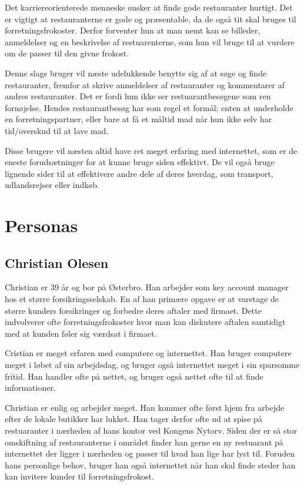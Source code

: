 \documentclass[a4paper, 12pt]{article}
\begin{document}
Det karriereorienterede menneske ønsker at finde gode restauranter hurtigt. Det
er vigtigt at restauranterne er gode og præsentable, da de også tit skal bruges
til forretningsfrokoster. Derfor forventer hun at man nemt kan se billeder,
anmeldelser og en beskrivelse af restuarenterne, som hun vil bruge til at
vurdere om de passer til den givne frokost. 

Denne slags bruger vil næste udelukkende benytte sig af at søge og finde
restauranter, fremfor at skrive anmeldelser af restauranter og kommentarer af
andres restauranter. Det er fordi hun ikke ser restuarantbesøgene som ren
fornøjelse. Hendes restaurantbesøg har som regel et formål; enten at underholde
en forretningspartner, eller bare at få et måltid mad når hun ikke selv har
tid/overskud til at lave mad. 

Disse brugere vil næsten altid have ret meget erfaring med internettet, som er
de eneste forudsætninger for at kunne bruge siden effektivt. De vil også bruge
lignende sider til at effektivere andre dele af deres hverdag, som transport,
udlandsrejser eller indkøb.

\section{Personas}
\label{sec:Personas}

\subsection{Christian Olesen}
Christian er 39 år og bor på Østerbro. Han arbejder som key account manager hos et større forsikringsselskab. En af han primære opgave er at varetage de større kunders forsikringer og forbedre deres aftaler med firmaet. Dette indvolverer ofte forretningsfrokoster hvor man kan diskutere aftalen samtidigt med at kunden føler sig værdsat i firmaet.

Cristian er meget erfaren med computere og internettet. Han bruger computere meget i løbet af sin arbejdsdag, og bruger også internettet meget i sin sparsomme fritid. Han handler ofte på nettet, og bruger også nettet ofte til at finde informationer. 

Christian er enlig og arbejder meget. Han kommer ofte først hjem fra arbejde efter de lokale butikker har lukket. Han tager derfor ofte ud at spise på restuaranter i nærheden af hans kontor ved Kongens Nytorv. Siden der er så stor omskiftning af restauranterne i området finder han gerne en ny restuarant på internettet der ligger i nærheden og passer til hvad han lige har lyst til. Foruden hans personlige behov, bruger han også internettet når han skal finde steder han kan invitere kunder til forretningsfrokost. 
\end{document}
